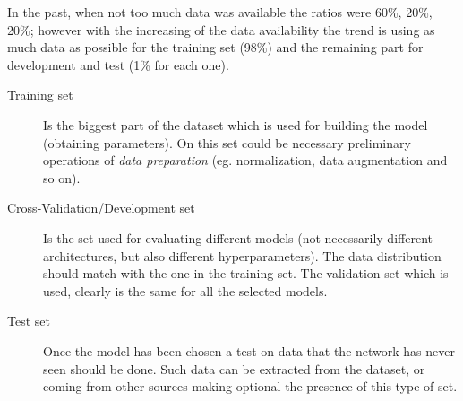 In the past, when not too much data was available the ratios were 60\%, 20\%, 20\%; however with the increasing of the data availability the trend is using as much data as possible for the training set (98\%) and the remaining part for development and test (1\% for each one).
 \begin{description}
    \item[Training set] Is the biggest part of the dataset which is used for building the model (obtaining parameters). On this set could be necessary preliminary operations of \textit{data preparation} (eg. normalization, data augmentation and so on).
    \item[Cross-Validation/Development set] Is the set used for evaluating different models (not necessarily different architectures, but also different hyperparameters). The data distribution should match with the one in the training set. The validation set which is used, clearly is the same for all the selected models.
    \item[Test set] Once the model has been chosen a test on data that the network has never seen should be done. Such data can be extracted from the dataset, or coming from other sources making optional the presence of this type of set.
\end{description}